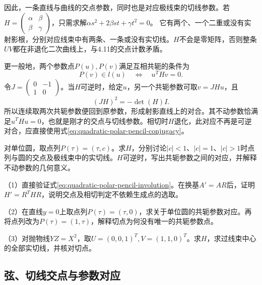 因此，一条直线与曲线的交点参数，同时也是对应极线束的切线参数。若\(H=\left(\begin{smallmatrix}\alpha&\beta\\\beta&\gamma\end{smallmatrix}\right)\)，只需求解\(\alpha s^2+2\beta st+\gamma t^2=0\)。
它有两个、一个二重或没有实射影根，分别对应线束中有两条、一条或没有实切线。\(H\)不会是零矩阵，否则整条\(UV\)都在非退化二次曲线上，与4.11的交点计数矛盾。

更一般地，两个参数点\(P(u),P(v)\)满足互相共轭的条件为
\begin{equation}\label{eq:quadratic-polar-pencil-conjugacy}
 P(v)\in l(u)\quad\Longleftrightarrow\quad u^THv=0.
\end{equation}
令\(J=\left(\begin{smallmatrix}0&-1\\1&0\end{smallmatrix}\right)\)。当\(H\)可逆时，给定\(u\)，另一个共轭参数可取\(v=JHu\)，且
\begin{equation}\label{eq:quadratic-polar-pencil-involution}
 (JH)^2=-\det(H)I.
\end{equation}
所以连续取两次共轭参数便回到原参数，形成射影直线上的对合。其不动参数恰满足\(u^THu=0\)，也就是刚才的交点与切线参数。相切时\(H\)退化，此对应不再是可逆对合，应直接使用式\eqref{eq:quadratic-polar-pencil-conjugacy}。

\begin{example}
对单位圆，取点列\(P(\tau)=(\tau,c)\)。求\(H\)，分别讨论\(|c|<1\)、\(|c|=1\)、\(|c|>1\)时点列与圆的交点及极线束中的实切线。\(H\)可逆时，写出共轭参数之间的对应，并解释不动参数的几何意义。
\end{example}

\begin{exercise}
\mbox{}\par\nobreak

（1）直接验证式\eqref{eq:quadratic-polar-pencil-involution}。在换基\(A'=AR\)后，证明\(H'=R^THR\)，说明交点及相切判定不依赖生成点的选取。

（2）在直线\(y=0\)上取点列\(P(\tau)=(\tau,0)\)，求关于单位圆的共轭参数对应。再将点列改为\(P(\tau)=(1,\tau)\)，解释切点为何没有唯一的共轭参数点。

（3）对抛物线\(YZ=X^2\)，取\(U=(0,0,1)^T,V=(1,1,0)^T\)。求\(H\)，求过线束中心的全部实切线，并核对切点。
\end{exercise}

\subsection{弦、切线交点与参数对应}
\label{subsec:quadratic-polar-pencil-chords}

